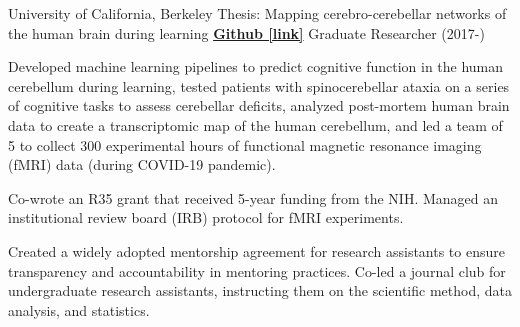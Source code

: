 

\begin{cventries}

  \cventry
    {University of California, Berkeley} %
    {Thesis: Mapping cerebro-cerebellar networks of the human brain during learning}
    {\href{https://github.com/maedbhk/cerebellum_learning_connect}{\textbf{Github [link]}}}
    {Graduate Researcher (2017-)} %
    {
      \begin{cvitems} %
        \item {Developed machine learning pipelines to predict cognitive function in the human cerebellum during learning, tested patients with spinocerebellar ataxia on a series of cognitive tasks to assess cerebellar deficits, analyzed post-mortem  human brain data to create a transcriptomic map of the human cerebellum, and led a team of 5 to collect 300 experimental hours of functional magnetic resonance imaging (fMRI) data (during COVID-19 pandemic).}
        \item {Co-wrote an R35 grant that received 5-year funding from the NIH. Managed an institutional review board (IRB) protocol for fMRI experiments.}
        \item {Created a widely adopted mentorship agreement for research assistants to ensure transparency and accountability in mentoring practices. Co-led a journal club for undergraduate research assistants, instructing them on the scientific method, data analysis, and statistics.}
      \end{cvitems}
    }
    

\end{cventries}
